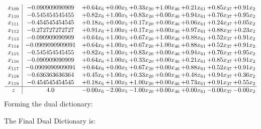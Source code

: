 \documentclass[8pt]{article}
\begin{document}
\[\begin{array}{c| c c@{\hskip 2pt} c@{\hskip 2pt} c@{\hskip 2pt} c@{\hskip 2pt} c@{\hskip 2pt} c@{\hskip 2pt} c@{\hskip 2pt} }
 x_{109}   &  -0.090909090909 & +  0.64 x_{6} & +  0.00 x_{5} & +  0.33 x_{20} & +  1.00 x_{46} & +  0.21 x_{61} & +  0.85 x_{37} & +  0.91 x_{2}\\
 x_{110}   &  -0.545454545455 & +  0.82 x_{6} & +  1.00 x_{5} & +  0.83 x_{20} & +  0.00 x_{46} & +  0.94 x_{61} & +  0.76 x_{37} & +  0.95 x_{2}\\
 x_{111}   &  -0.454545454545 & +  0.18 x_{6} & +  0.00 x_{5} & +  0.17 x_{20} & +  0.00 x_{46} & +  0.06 x_{61} & +  0.24 x_{37} & +  0.05 x_{2}\\
 x_{112}   &  -0.272727272727 & +  0.91 x_{6} & +  1.00 x_{5} & +  0.17 x_{20} & +  0.00 x_{46} & +  0.97 x_{61} & +  0.88 x_{37} & +  0.23 x_{2}\\
 x_{113}   &  -0.090909090909 & +  0.64 x_{6} & +  1.00 x_{5} & +  0.67 x_{20} & +  1.00 x_{46} & +  0.88 x_{61} & +  0.52 x_{37} & +  0.91 x_{2}\\
 x_{114}   &  -0.0909090909091 & +  0.64 x_{6} & +  1.00 x_{5} & +  0.67 x_{20} & +  1.00 x_{46} & +  0.88 x_{61} & +  0.52 x_{37} & +  0.91 x_{2}\\
 x_{115}   &  -0.545454545455 & +  0.82 x_{6} & +  1.00 x_{5} & +  0.83 x_{20} & +  0.00 x_{46} & +  0.94 x_{61} & +  0.76 x_{37} & +  0.95 x_{2}\\
 x_{116}   &  -0.090909090909 & +  0.64 x_{6} & +  1.00 x_{5} & +  0.33 x_{20} & +  0.00 x_{46} & +  0.21 x_{61} & +  0.85 x_{37} & +  0.91 x_{2}\\
 x_{117}   &  -0.0909090909091 & +  0.64 x_{6} & +  0.00 x_{5} & +  0.67 x_{20} & +  0.00 x_{46} & +  0.88 x_{61} & +  0.52 x_{37} & +  0.91 x_{2}\\
 x_{118}   &  -0.636363636364 & +  0.45 x_{6} & +  1.00 x_{5} & +  0.33 x_{20} & +  0.00 x_{46} & +  0.48 x_{61} & +  0.94 x_{37} & +  0.36 x_{2}\\
 x_{119}   &  -0.454545454545 & +  0.18 x_{6} & +  1.00 x_{5} & +  1.00 x_{20} & +  0.00 x_{46} & +  0.73 x_{61} & +  0.91 x_{37} & +  0.55 x_{2}\\
\hline
z    &  4.0 & -0.00 x_{6} & -2.00 x_{5} & -1.00 x_{20} & +  0.00 x_{46} & +  0.00 x_{61} & -0.00 x_{37} & -0.00 x_{2}\\
\end{array}\]
Forming the dual dictionary:

The Final Dual Dictionary is: 
\end{document}

